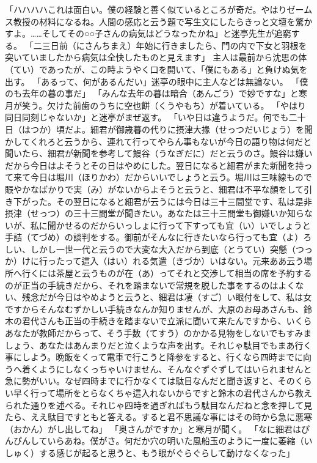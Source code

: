 \documentclass{book}
\begin{document}
「ハハハハこれは面白い。僕の経験と善く似ているところが奇だ。やはりゼームス教授の材料になるね。人間の感応と云う題で写生文にしたらきっと文壇を驚かすよ。\ldots{}\ldots{}そしてその○○子さんの病気はどうなったかね」と迷亭先生が追窮する。
「二三日前（にさんちまえ）年始に行きましたら、門の内で下女と羽根を突いていましたから病気は全快したものと見えます」
主人は最前から沈思の体（てい）であったが、この時ようやく口を開いて、「僕にもある」と負けぬ気を出す。
「あるって、何があるんだい」迷亭の眼中に主人などは無論ない。
「僕のも去年の暮の事だ」
「みんな去年の暮は暗合（あんごう）で妙ですな」と寒月が笑う。欠けた前歯のうちに空也餅（くうやもち）が着いている。
「やはり同日同刻じゃないか」と迷亭がまぜ返す。
「いや日は違うようだ。何でも二十日（はつか）頃だよ。細君が御歳暮の代りに摂津大掾（せっつだいじょう）を聞かしてくれろと云うから、連れて行ってやらん事もないが今日の語り物は何だと聞いたら、細君が新聞を参考して鰻谷（うなぎだに）だと云うのさ。鰻谷は嫌いだから今日はよそうとその日はやめにした。翌日になると細君がまた新聞を持って来て今日は堀川（ほりかわ）だからいいでしょうと云う。堀川は三味線もので賑やかなばかりで実（み）がないからよそうと云うと、細君は不平な顔をして引き下がった。その翌日になると細君が云うには今日は三十三間堂です、私は是非摂津（せっつ）の三十三間堂が聞きたい。あなたは三十三間堂も御嫌いか知らないが、私に聞かせるのだからいっしょに行って下すっても宜（い）いでしょうと手詰（てづめ）の談判をする。御前がそんなに行きたいなら行っても宜（よ）ろしい、しかし一世一代と云うので大変な大入だから到底（とうてい）突懸（つっか）けに行ったって這入（はい）れる気遣（きづか）いはない。元来ああ云う場所へ行くには茶屋と云うものが在（あ）ってそれと交渉して相当の席を予約するのが正当の手続きだから、それを踏まないで常規を脱した事をするのはよくない、残念だが今日はやめようと云うと、細君は凄（すご）い眼付をして、私は女ですからそんなむずかしい手続きなんか知りませんが、大原のお母あさんも、鈴木の君代さんも正当の手続きを踏まないで立派に聞いて来たんですから、いくらあなたが教師だからって、そう手数（てすう）のかかる見物をしないでもすみましょう、あなたはあんまりだと泣くような声を出す。それじゃ駄目でもまあ行く事にしよう。晩飯をくって電車で行こうと降参をすると、行くなら四時までに向うへ着くようにしなくっちゃいけません、そんなぐずぐずしてはいられませんと急に勢がいい。なぜ四時までに行かなくては駄目なんだと聞き返すと、そのくらい早く行って場所をとらなくちゃ這入れないからですと鈴木の君代さんから教えられた通りを述べる。それじゃ四時を過ぎればもう駄目なんだねと念を押して見たら、ええ駄目ですともと答える。すると君不思議な事にはその時から急に悪寒（おかん）がし出してね」
「奥さんがですか」と寒月が聞く。
「なに細君はぴんぴんしていらあね。僕がさ。何だか穴の明いた風船玉のように一度に萎縮（いしゅく）する感じが起ると思うと、もう眼がぐらぐらして動けなくなった」
\end{document}
